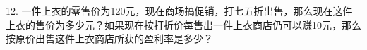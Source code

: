 12.	一件上衣的零售价为120元，现在商场搞促销，打七五折出售，那么现在这件上衣的售价为多少元？如果现在按打折价每售出一件上衣商店仍可以赚10元，那么按原价出售这件上衣商店所获的盈利率是多少？



